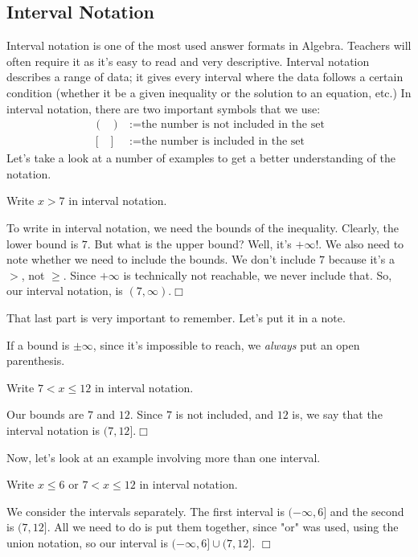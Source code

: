 \documentclass[../book.tex]{subfiles}
\begin{document}
\subsection{Interval Notation}
\noindent Interval notation is one of the most used answer formats in Algebra.  Teachers will often require it as it's easy to read and very descriptive.  Interval notation describes a range of data; it gives every interval where the data follows a certain condition (whether it be a given inequality or the solution to an equation, etc.) In interval notation, there are two important symbols that we use:  \begin{align*}
    (\text{ }) &:= \text{the number is not included in the set} \\
    [\text{ }] &:= \text{the number is included in the set}
\end{align*}
Let's take a look at a number of examples to get a better understanding of the notation.
\begin{example}
Write $x>7$ in interval notation.
\end{example}
\begin{solution}
To write in interval notation, we need the bounds of the inequality.  Clearly, the lower bound is $7$.  But what is the upper bound?  Well, it's $+\infty$!.  We also need to note whether we need to include the bounds.  We don't include $7$ because it's a $>$, not $\geq$.  Since $+\infty$ is technically not reachable, we never include that.  So, our interval notation, is $(7,\infty)$.$\Box$
\end{solution}
\noindent That last part is very important to remember.  Let's put it in a note.
\begin{note}
If a bound is $\pm\infty$, since it's impossible to reach, we \textit{always} put an open parenthesis.
\end{note}
\begin{example}
Write $7<x\leq 12$ in interval notation.
\end{example}
\begin{solution}
Our bounds are $7$ and $12$.  Since $7$ is not included, and $12$ is, we say that the interval notation is $(7,12]$.$\Box$
\end{solution}
\noindent Now, let's look at an example involving more than one interval.
\begin{example}
Write $x \leq 6$ or $7<x\leq 12$ in interval notation.  
\end{example}
\begin{solution}
We consider the intervals separately.  The first interval is $(-\infty,6]$ and the second is $(7,12]$.  All we need to do is put them together, since "or" was used, using the union notation, so our interval is $(-\infty,6]\cup(7,12]$.  $\Box$
\end{solution}
\end{document}
